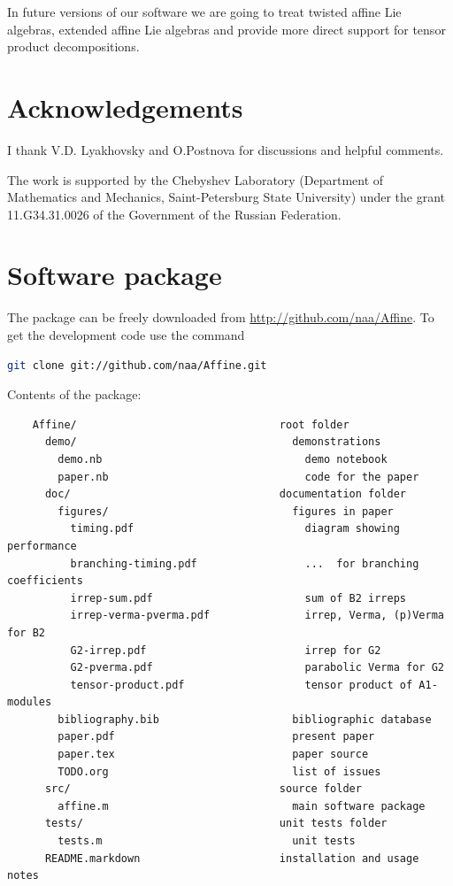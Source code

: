 \documentclass[preprint,12pt]{elsarticle}
\begin{document}
In future versions of our software we are going to treat twisted affine Lie algebras, extended affine Lie algebras and provide more direct support for tensor product decompositions. 

\section*{Acknowledgements}
\label{sec:acknowledgements}
I thank V.D. Lyakhovsky and O.Postnova for discussions and helpful comments.

The work is supported by the Chebyshev Laboratory
(Department of Mathematics and Mechanics, Saint-Petersburg State
University) under the grant 11.G34.31.0026 of the Government of the
Russian Federation.


\appendix

\section{Software package}
\label{package}
The package can be freely downloaded from \url{http://github.com/naa/Affine}. To get the development code use the command
\begin{lstlisting}[language=bash]
 git clone git://github.com/naa/Affine.git
\end{lstlisting}

Contents of the package:
\begin{verbatim}
    Affine/                                root folder
      demo/                                  demonstrations
        demo.nb                                demo notebook
        paper.nb                               code for the paper
      doc/                                 documentation folder
        figures/                             figures in paper 
          timing.pdf                           diagram showing performance
          branching-timing.pdf                 ...  for branching coefficients  
          irrep-sum.pdf                        sum of B2 irreps
          irrep-verma-pverma.pdf               irrep, Verma, (p)Verma for B2
          G2-irrep.pdf                         irrep for G2
          G2-pverma.pdf                        parabolic Verma for G2
          tensor-product.pdf                   tensor product of A1-modules
        bibliography.bib                     bibliographic database
        paper.pdf                            present paper
        paper.tex                            paper source
        TODO.org                             list of issues
      src/                                 source folder
        affine.m                             main software package
      tests/                               unit tests folder
        tests.m                              unit tests
      README.markdown                      installation and usage notes
\end{verbatim}
\end{document}
